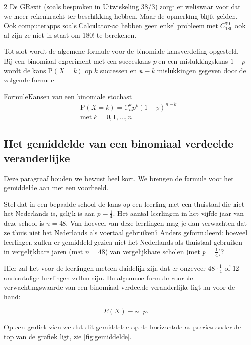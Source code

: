 \begin{multicols}{2}
 De GRexit (zoals besproken in Uitwiskeling 38/3) zorgt er weliswaar voor dat we meer rekenkracht ter beschikking hebben. Maar de opmerking blijft gelden. Ook computerapps zoals Calculator-$\infty$ hebben geen enkel probleem met $C^{70}_{180}$ ook al zijn ze niet in staat om 180! te berekenen.

 Tot slot wordt de algemene formule voor de binomiale kansverdeling opgesteld. Bij een binomiaal experiment met een succeskans $p$ en een mislukkingskans $1-p$ wordt de kans $\textrm{P}(X=k)$ op $k$ successen en $n-k$ mislukkingen gegeven door de volgende formule. 

 \begin{kader}{Formule}{Kansen van een binomiale stochast}
\begin{equation}
\begin{split}
&\textrm{P}(X=k) = C^k_n p^{k} (1-p)^{n-k} \\
&\textrm{met }k=0,1,\ldots,n
\label{eq:Eqbinomiale}
\end{split}
\end{equation}
\end{kader}
 
\subsection*{Het gemiddelde van een binomiaal verdeelde veranderlijke}

Deze paragraaf houden we bewust heel kort. We brengen de formule voor het gemiddelde aan met een voorbeeld. 

Stel dat in een bepaalde school de kans op een leerling met een thuistaal die niet het Nederlands is, gelijk is aan $p=\frac{1}{4}$. Het aantal leerlingen in het vijfde jaar van deze school is $n=48$. Van hoeveel van deze leerlingen mag je dan verwachten dat ze thuis niet het Nederlands als voertaal gebruiken? Anders geformuleerd: hoeveel leerlingen zullen er gemiddeld gezien niet het Nederlands als thuistaal gebruiken in vergelijkbare jaren (met $n=48$) van vergelijkbare scholen (met $p=\frac{1}{4}$)? 

Hier zal het voor de leerlingen meteen duidelijk zijn dat er ongeveer $48 \cdot \frac{1}{4}$ of 12 anderstalige leerlingen zullen zijn. De algemene formule voor de verwachtingswaarde van een binomiaal verdeelde veranderlijke ligt nu voor de hand:

\[E(X)=n\cdot p.\]

Op een grafiek zien we dat dit gemiddelde op de horizontale as precies onder de top van de grafiek ligt, zie \autoref{fig:gemiddelde}.


\end{multicols}
